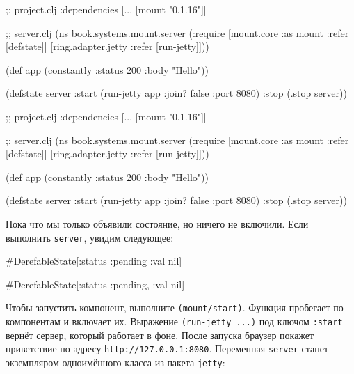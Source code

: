 \begin{english}
  \begin{clojure}
;; project.clj
:dependencies [... [mount "0.1.16"]]

;; server.clj
(ns book.systems.mount.server
  (:require
   [mount.core :as mount
    :refer [defstate]]
   [ring.adapter.jetty
    :refer [run-jetty]]))

(def app (constantly
           {:status 200 :body "Hello"}))

(defstate server
  :start (run-jetty app
           {:join? false :port 8080})
  :stop (.stop server))
  \end{clojure}
\end{english}

\else

\begin{english}
  \begin{clojure}
;; project.clj
:dependencies [... [mount "0.1.16"]]

;; server.clj
(ns book.systems.mount.server
  (:require
   [mount.core :as mount :refer [defstate]]
   [ring.adapter.jetty :refer [run-jetty]]))

(def app (constantly {:status 200 :body "Hello"}))

(defstate server
  :start (run-jetty app {:join? false :port 8080})
  :stop (.stop server))
  \end{clojure}
\end{english}

\fi

Пока что мы только объявили состояние, но ничего не включили. Если выполнить
\verb|server|, увидим следующее:

\ifnarrow

\begin{english}
  \begin{clojure}
#DerefableState[{:status :pending
                 :val nil}]
  \end{clojure}
\end{english}

\else

\begin{english}
  \begin{clojure}
#DerefableState[{:status :pending, :val nil}]
  \end{clojure}
\end{english}

\fi

\mnoindent
Чтобы запустить компонент, выполните \texttt{(mount\-/start)}. Функция пробегает
по компонентам и включает их. Выражение \verb|(run-jetty ...)| под ключом
\verb|:start| вернёт сервер, который работает в фоне. После запуска браузер
покажет приветствие по адресу \verb|http://127.0.0.1:8080|. Переменная
\verb|server| станет экземпляром одноимённого класса из пакета \verb|jetty|:

